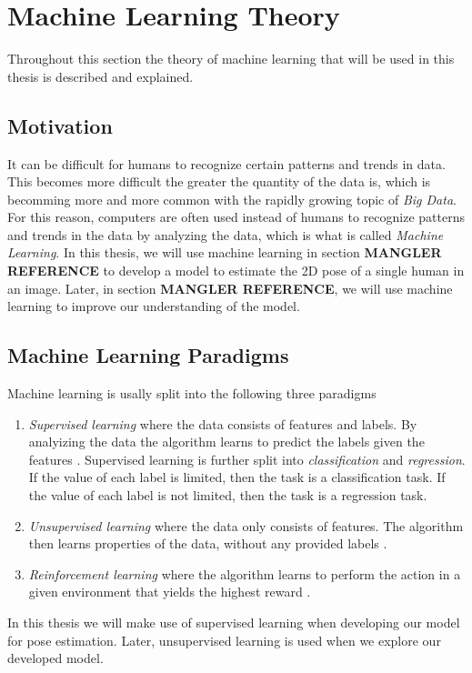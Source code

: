 \documentclass[./main.tex]{subfiles}
\begin{document}
\section{Machine Learning Theory}
Throughout this section the theory of machine learning that will be used in this thesis is described and explained.

\subsection{Motivation}
It can be difficult for humans to recognize certain patterns and trends in data. This becomes more difficult the greater the quantity of the data is, which is becomming more and more common with the rapidly growing topic of \textit{Big Data}. For this reason, computers are often used instead of humans to recognize patterns and trends in the data by analyzing the data, which is what is called \textit{Machine Learning}. In this thesis, we will use machine learning in section \textbf{MANGLER REFERENCE} to develop a model to estimate the 2D pose of a single human in an image. Later, in section \textbf{MANGLER REFERENCE}, we will use machine learning to improve our understanding of the model.

\subsection{Machine Learning Paradigms}
Machine learning is usally split into the following three paradigms
\begin{enumerate}
    \item \textit{Supervised learning} where the data consists of features and labels. By analyizing the data the algorithm learns to predict the labels given the features \cite{ESL}. Supervised learning is further split into \textit{classification} and \textit{regression}. If the value of each label is limited, then the task is a classification task. If the value of each label is not limited, then the task is a regression task. 
    \item \textit{Unsupervised learning} where the data only consists of features. The algorithm then learns properties of the data, without any provided labels \cite{ESL}.
    \item \textit{Reinforcement learning} where the algorithm learns to perform the action in a given environment that yields the highest reward \cite{PRML}.
\end{enumerate}
In this thesis we will make use of supervised learning when developing our model for pose estimation. Later, unsupervised learning is used when we explore our developed model.
\end{document}
